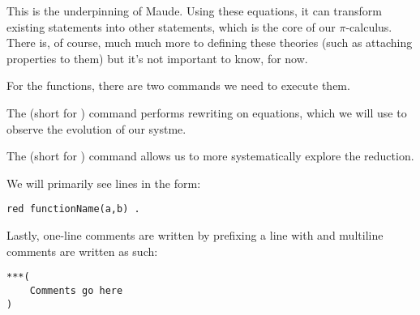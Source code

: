 This is the underpinning of Maude. Using these equations, it can transform existing statements into other statements, which is the core of our $\pi$-calculus. There is, of course, much much more to defining these theories (such as attaching properties to them) but it's not important to know, for now.

For the functions, there are two commands we need to execute them.

The  (short for ) command performs rewriting on equations, which we will use to observe the evolution of our systme.

The  (short for ) command allows us to more systematically explore the reduction. 

We will primarily see lines in the form:

\begin{verbatim}
red functionName(a,b) .
\end{verbatim}

Lastly, one-line comments are written by prefixing a line with \code{---} and multiline comments are written as such:
\begin{verbatim}
***(
    Comments go here
)
\end{verbatim}

